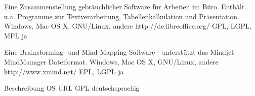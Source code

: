 \documentclass[11pt,a4paper,landscape,twocolumn]{article}
\begin{document}


{Eine Zusammenstellung gebräuchlicher Software für Arbeiten im Büro. Enthält u.a. Programme zur Textverarbeitung, Tabellenkalkulation und Präsentation.}
{Windows, Mac OS X, GNU/Linux, andere}
{http://de.libreoffice.org/}
{GPL, LGPL, MPL}
{ja}

{Eine Brainstorming- und Mind-Mapping-Software - unterstützt das Mindjet MindManager Dateiformat.}
{Windows, Mac OS X, GNU/Linux, andere}
{http://www.xmind.net/}
{EPL, LGPL}
{ja}


\newpage %


{Beschreibung}
{OS}
{URL}
{GPL}
{deutschsprachig}
\end{document}
